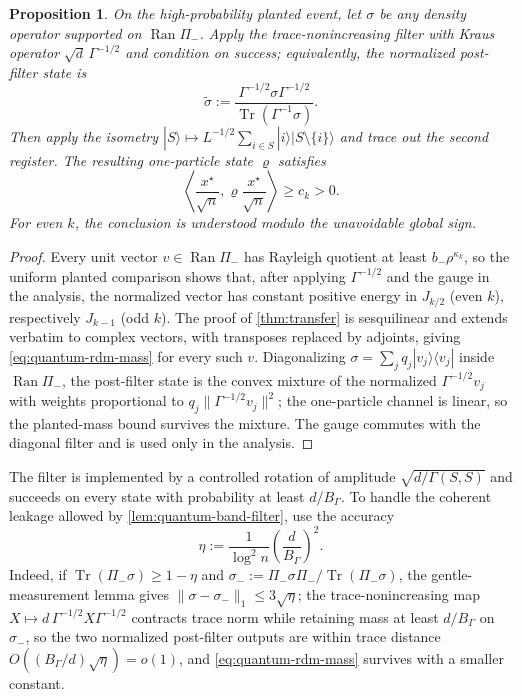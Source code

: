 \documentclass[11pt]{article}
\newtheorem{proposition}[proposition]{Proposition}
\theoremstyle{definition}
\theoremstyle{remark}
\newcommand{\1}{\mathbf 1}
\newcommand{\xstar}{{x^\star}}
\DeclareMathOperator{\Tr}{Tr}
\numberwithin{equation}{section}
\begin{document}
\begin{proposition}\label{prop:quantum-cutoff-recovery}
On the high-probability planted event, let $\sigma$ be any density operator
supported on $\operatorname{Ran}\Pi_-$.  Apply the trace-nonincreasing
filter with Kraus operator $\sqrt d\,\Gamma^{-1/2}$ and condition on
success; equivalently, the normalized post-filter state is
\begin{equation}\label{eq:quantum-filtered-state}
 \widetilde\sigma
 :=\frac{\Gamma^{-1/2}\sigma\Gamma^{-1/2}}
 {\Tr(\Gamma^{-1}\sigma)}.
\end{equation}
Then apply the isometry
$|S\rangle\mapsto L^{-1/2}\sum_{i\in S}|i\rangle|S\setminus\{i\}\rangle$
and trace out the second register.  The resulting one-particle state
$\varrho$ satisfies
\begin{equation}\label{eq:quantum-rdm-mass}
 \left\langle\frac{\xstar}{\sqrt n},
 \varrho\frac{\xstar}{\sqrt n}\right\rangle\ge c_k>0.
\end{equation}
For even $k$, the conclusion is understood modulo the unavoidable global
sign.
\end{proposition}
\begin{proof}
Every unit vector $v\in\operatorname{Ran}\Pi_-$ has Rayleigh quotient
at least $b_-\rho^{\kappa_k}$, so the uniform planted comparison shows
that, after applying $\Gamma^{-1/2}$ and the gauge in the analysis, the
normalized vector has constant positive energy in $J_{k/2}$ (even $k$),
respectively $J_{k-1}$ (odd $k$).  The proof of \cref{thm:transfer} is
sesquilinear and extends verbatim to complex vectors, with transposes
replaced by adjoints, giving \cref{eq:quantum-rdm-mass} for every such
$v$.  Diagonalizing $\sigma=\sum_jq_j|v_j\rangle\langle v_j|$ inside
$\operatorname{Ran}\Pi_-$, the post-filter state is the convex mixture
of the normalized $\Gamma^{-1/2}v_j$ with weights proportional to
$q_j\|\Gamma^{-1/2}v_j\|^2$; the one-particle channel is linear, so the
planted-mass bound survives the mixture.  The gauge commutes with the
diagonal filter and is used only in the analysis.
\end{proof}

The filter is implemented by a controlled rotation of amplitude
$\sqrt{d/\Gamma(S,S)}$ and succeeds on every state with probability at
least $d/B_\Gamma$.  To handle the coherent leakage allowed by
\cref{lem:quantum-band-filter}, use the accuracy
\begin{equation}\label{eq:quantum-leakage-choice}
        \eta:=\frac1{\log^2 n}\left(\frac d{B_\Gamma}\right)^2 .
\end{equation}
Indeed, if $\Tr(\Pi_-\sigma)\ge1-\eta$ and
$\sigma_-:=\Pi_-\sigma\Pi_-/\Tr(\Pi_-\sigma)$, the gentle-measurement
lemma gives $\|\sigma-\sigma_-\|_1\le3\sqrt\eta$; the
trace-nonincreasing map $X\mapsto d\,\Gamma^{-1/2}X\Gamma^{-1/2}$
contracts trace norm while retaining mass at least $d/B_\Gamma$ on
$\sigma_-$, so the two normalized post-filter outputs are within trace
distance $O((B_\Gamma/d)\sqrt\eta)=o(1)$, and
\cref{eq:quantum-rdm-mass} survives with a smaller constant.
\end{document}
